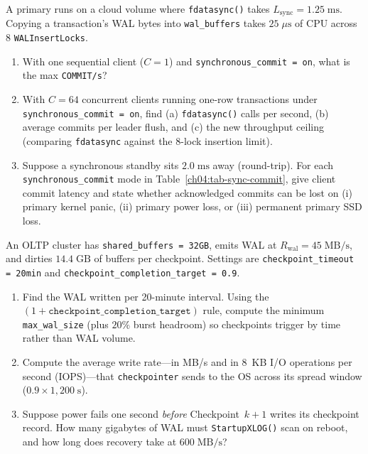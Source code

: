 \begin{exercise}
\label{ch04:ex-group-commit}
A primary runs on a cloud volume where \texttt{fdatasync()} takes $L_{\text{sync}} = 1.25\;\text{ms}$. Copying a transaction's WAL bytes into \texttt{wal\_buffers} takes $25\;\mu\text{s}$ of CPU across $8$ \texttt{WALInsertLocks}.
\begin{enumerate}
  \item With one sequential client ($C = 1$) and \texttt{synchronous\_commit = on}, what is the max \texttt{COMMIT/s}?
  \item With $C = 64$ concurrent clients running one-row transactions under \texttt{synchronous\_commit = on}, find (a) \texttt{fdatasync()} calls per second, (b) average commits per leader flush, and (c) the new throughput ceiling (comparing \texttt{fdatasync} against the $8$-lock insertion limit).
  \item Suppose a synchronous standby sits $2.0\;\text{ms}$ away (round-trip). For each \texttt{synchronous\_commit} mode in Table~\ref{ch04:tab-sync-commit}, give client commit latency and state whether acknowledged commits can be lost on (i) primary kernel panic, (ii) primary power loss, or (iii) permanent primary SSD loss.
\end{enumerate}
\end{exercise}

\begin{exercise}
\label{ch04:ex-checkpoint-sizing}
An OLTP cluster has \texttt{shared\_buffers = 32GB}, emits WAL at $R_{\text{wal}} = 45\;\text{MB/s}$, and dirties $14.4\;\text{GB}$ of buffers per checkpoint. Settings are \texttt{checkpoint\_timeout = 20min} and \texttt{checkpoint\_completion\_target = 0.9}.
\begin{enumerate}
  \item Find the WAL written per 20-minute interval. Using the $(1 + \texttt{checkpoint\_completion\_target})$ rule, compute the minimum \texttt{max\_wal\_size} (plus $20\%$ burst headroom) so checkpoints trigger by time rather than WAL volume.
  \item Compute the average write rate---in MB/s and in 8~KB I/O operations per second (IOPS)---that \texttt{checkpointer} sends to the OS across its spread window ($0.9 \times 1{,}200\;\text{s}$).
  \item Suppose power fails one second \emph{before} Checkpoint~$k+1$ writes its checkpoint record. How many gigabytes of WAL must \texttt{StartupXLOG()} scan on reboot, and how long does recovery take at $600\;\text{MB/s}$?
\end{enumerate}
\end{exercise}

\chapterline
